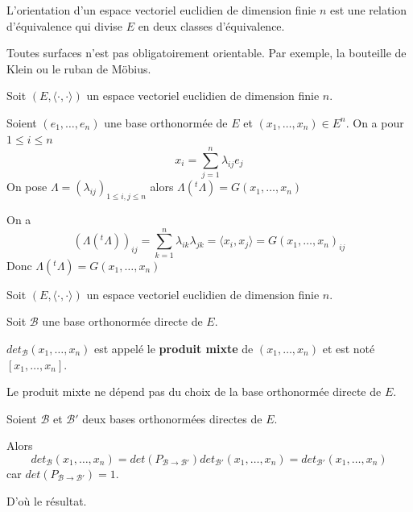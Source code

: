 \documentclass[a4paper, 12pt]{article}
\begin{document}
\begin{remarque}
    L'orientation d'un espace vectoriel euclidien de dimension finie $n$ est une relation d'équivalence qui divise $E$ en deux classes d'équivalence.
\end{remarque}

\begin{remarque}
    Toutes surfaces n'est pas obligatoirement orientable. Par exemple, la bouteille de Klein ou le ruban de Möbius.
\end{remarque}

\begin{proposition}{}{}
    Soit $(E, \langle \cdot, \cdot \rangle)$ un espace vectoriel euclidien de dimension finie $n$.

    Soient $(e_1, \dots, e_n)$ une base orthonormée de $E$ et $(x_1, \dots, x_n) \in E^n$. On a pour $1 \leq i \leq n$
    $$
    x_i = \sum_{j=1}^n \lambda_{ij} e_j
    $$
    On pose $\Lambda = (\lambda_{ij})_{1 \leq i, j \leq n}$ alors $\Lambda(^t \Lambda) = G(x_1, \dots, x_n)$
\end{proposition}

\begin{demonstration}
    On a
    $$
    (\Lambda(^t \Lambda))_{ij} = \sum_{k=1}^n \lambda_{ik} \lambda_{jk} = \langle x_i, x_j \rangle = G(x_1, \dots, x_n)_{ij}
    $$
    Donc $\Lambda(^t \Lambda) = G(x_1, \dots, x_n)$
\end{demonstration}

\begin{definition}
    Soit $(E, \langle \cdot, \cdot \rangle)$ un espace vectoriel euclidien de dimension finie $n$.
    
    Soit $\mathcal{B}$ une base orthonormée directe de $E$.
    
    $det_\mathcal{B}(x_1, \dots, x_n)$ est appelé le \textbf{produit mixte} de $(x_1, \dots, x_n)$ et est noté $[x_1, \dots, x_n]$.
\end{definition}

\begin{proposition}{}{}
    Le produit mixte ne dépend pas du choix de la base orthonormée directe de $E$.
\end{proposition}

\begin{demonstration}
    Soient $\mathcal{B}$ et $\mathcal{B}'$ deux bases orthonormées directes de $E$.

    Alors
    $$
    det_\mathcal{B}(x_1, \dots, x_n) = det(P_{\mathcal{B} \to \mathcal{B}'}) det_\mathcal{B'}(x_1, \dots, x_n) = det_\mathcal{B'}(x_1, \dots, x_n)
    $$
    car $det(P_{\mathcal{B} \to \mathcal{B}'}) = 1$.

    D'où le résultat.
\end{demonstration}
\end{document}
